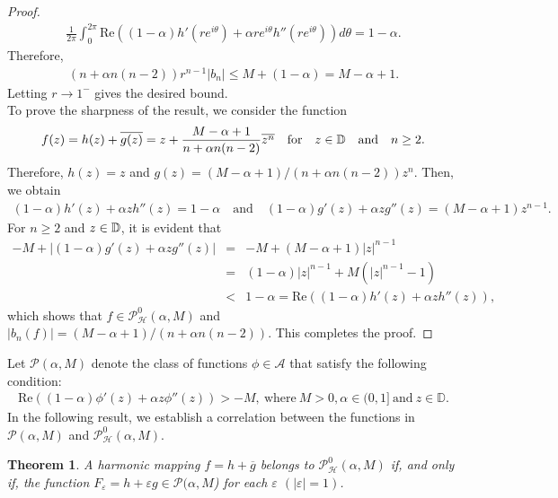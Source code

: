 \documentclass[11pt,reqno]{amsart}
\newtheorem{theo}{Theorem}[section]
\newtheorem{open problem}{Open problem}[section]
\newcommand{\ol}{\overline}
\newcommand{\beas}{\begin{eqnarray*}}
\newcommand{\eeas}{\end{eqnarray*}}
\renewcommand{\epsilon}{\varepsilon}
\numberwithin{equation}{section}
\begin{document}
\begin{proof}
\beas \frac{1}{2\pi}\int_0^{2\pi}\text{Re}\left((1-\alpha)h'(re^{i\theta})+\alpha re^{i\theta}h''(re^{i\theta})\right)d\theta = 1-\alpha.\eeas
Therefore,
\beas \left(n+\alpha n(n-2)\right) r^{n-1}|b_n| \leq M + (1-\alpha) = M - \alpha + 1.\eeas
Letting $r\to 1^-$ gives the desired bound.\\[2mm]
\indent To prove the sharpness of the result, we consider the function
 $$f(z)=h(z)+\ol{g(z)} = z + \frac{M-\alpha+1}{n+\alpha n(n-2)}\overline{z^n}\quad\text{for}\quad z\in\Bbb{D}\quad\text{and}\quad n\geq2.$$
Therefore, $h(z) = z$ and $g(z) =(M-\alpha+1)/(n+\alpha n(n-2))z^n$. Then, we obtain
\beas (1-\alpha)h'(z) + \alpha zh''(z)=1-\alpha\quad\text{and}\quad(1-\alpha)g'(z) + \alpha zg''(z) = (M-\alpha+1)z^{n-1}.\eeas
For $n\geq 2$ and $z\in\Bbb{D}$, it is evident that 
\beas -M + \left|(1-\alpha)g'(z) + \alpha zg''(z)\right| &=& -M + (M-\alpha+1)|z|^{n-1}\\
&=&(1-\alpha)|z|^{n-1}+M\left(|z|^{n-1}-1\right)\\
&<&1-\alpha=\text{Re}\left((1-\alpha)h'(z) + \alpha zh''(z)\right),\eeas
which shows that $f \in \mathcal{P}_{\mathcal{H}}^{0}(\alpha,M)$ and $|b_n(f)|=(M-\alpha+1)/(n+\alpha n(n-2))$.
This completes the proof.\end{proof}
\noindent Let $\mathcal{P}(\alpha,M)$ denote the class of functions $\phi\in \mathcal{A}$ that satisfy the following condition:
\beas \text{Re}\left((1-\alpha)\phi'(z)+ \alpha z\phi''(z)\right)>-M,~\text{where}~M >0, \alpha\in(0,1]~\text{and}~ z\in\mathbb{D}.\eeas
In the following result, we establish a correlation between the functions in $\mathcal{P}(\alpha,M)$ and $\mathcal{P}_{\mathcal{H}}^0(\alpha, M)$.
\begin{theo}\label{T1}
A harmonic mapping $f=h+\ol{g}$ belongs to $\mathcal{P}_{\mathcal{H}}^0(\alpha,M)$ if, and only if, the
function $F_\epsilon=h +\epsilon g\in\mathcal{P}(\alpha,M$) for each $\epsilon$ $(|\epsilon|=1)$.
\end{theo}
\end{document}
